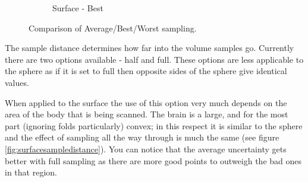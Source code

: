 \begin{figure}[H]
\begin{subfigure}[b]{0.32\textwidth}
    \caption*{Surface - Best}
    \label{fig:surfacebest}  
  \end{subfigure}  
  \caption{Comparison of Average/Best/Worst sampling.}\label{fig:surfaceaccumulator}
\end{figure}

The sample distance determines how far into the volume samples go. Currently there are two options available - half and full. These options are less applicable to the sphere as if it is set to full then opposite sides of the sphere give identical values.

When applied to the surface the use of this option very much depends on the area of the body that is being scanned. The brain is a large, and for the most part (ignoring folds particularly) convex; in this respect it is similar to the sphere and the effect of sampling all the way through is much the same (see figure \ref{fig:surfacesampledistance}). You can notice that the average uncertainty gets better with full sampling as there are more good points to outweigh the bad ones in that region.

